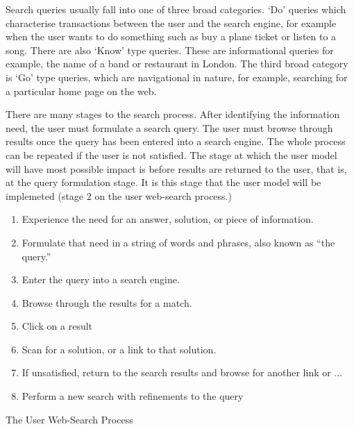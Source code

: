 \documentclass[a4paper, 11pt]{article}
\begin{document}
Search queries usually fall into one of three broad categories.  `Do' queries which characterise transactions between the user and the search engine, for example when the user wants to do something such as buy a plane ticket or listen to a song. There are also `Know' type queries. These are informational queries for example, the name of a band or restaurant in London. The third broad category is `Go' type queries, which are navigational in nature, for example, searching for a particular home page on the web. 

There are many stages to the search process. After identifying the information need, the user must formulate a search query. The user must browse through results once the query has been entered into a search engine. The whole process can be repeated if the user is not satisfied. The stage at which the user model will have most possible impact is before results are returned to the user, that is, at the query formulation stage. It is this stage that the user model will be implemeted (stage 2 on the user web-search process.)


\begin{center}
\begin{enumerate}
\item{Experience the need for an answer,
solution, or piece of information.}
\item{Formulate that need in a string of words and phrases, also known as “the query.”}
\item{Enter the query into a search engine.}
\item{Browse through the results for a match.}
\item{Click on a result}
\item{Scan for a solution, or a link to that solution.}
\item{If unsatisfied, return to the search results and browse for another link or ...}
\item{Perform a new search with refinements to the query}
\label{search flows}
\end {enumerate}

\hspace{1.5cm}
The User Web-Search Process \cite{seo}

\end{center}
\end{document}
